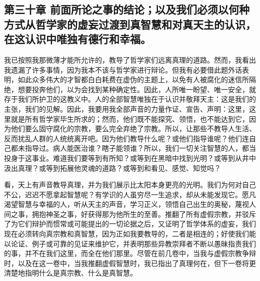 
\subsection{第三十章 前面所论之事的结论；以及我们必须以何种方式从哲学家的虚妄过渡到真智慧和对真天主的认识，在这认识中唯独有德行和幸福。}

我已按照我那微薄才能所允许的，教导了哲学家们远离真理的道路。然而，我看出我遗漏了许多事情，因为我本不该与哲学家进行辩论。但我有必要借此题外话表明，如此众多伟大的才智都白白耗费在虚伪的主题上，以免有人被腐化的迷信所隔绝，想要投奔他们，以为会找到某种确定性。因此，人所唯一盼望、唯一安全，就存于我们所护卫的这教义中。人的全部智慧唯独在于认识并敬拜天主：这是我们的主张，我们的见解。因此，我要用我全部声音的力量作证、宣告、声明：这里，这里就是所有哲学家毕生所求的；然而，他们既不能探究、领悟，也不能达到它，因为他们要么固守腐化的宗教，要么完全弃绝了宗教。所以，让那些不教导人生活、反而扰乱人群的人统统离开吧。因为他们教导什么呢？或他们指导谁呢？他们连自己都未指导过。病人能医治谁？瞎子能领谁？所以，我们一切关注智慧的人，都当投身于这事业。难道我们要等到有所知？或等到在黑暗中找到光明？或等到从井中汲出真理？或等到拓展他灵魂的道路？或等到和看见、感觉、知觉吗？\par

看，天上有声音教导真理，并为我们展示比太阳本身更亮的光明。我们为何对自己不公，迟迟不愿拿起智慧呢？有学识的人虽穷尽一生追求，却从未能发现它。愿凡渴望智慧与幸福的人，听从天主的声音，学习正义，领悟自己出生的奥秘，蔑视人间之事，拥抱神圣之事，好获得那为他所生的至善。推翻了所有虚假宗教，并驳斥了为它们辩护而惯常或可能提出的一切论据之后，又证明了哲学体系的虚妄，我们现在必须转向真宗教和真智慧，因为正如我要教导的，二者是相连的；好使我们能以论证、例子或可靠的见证来维护它，并表明那些异教崇拜者不断以愚昧指责我们的事，并不在我们这里，而全在他们那里。尽管在前几卷中，当我与虚假宗教争辩时，以及在这一卷中，当我推翻虚假智慧时，我已指出了真理何在，但下一卷将更清楚地指明什么是真宗教、什么是真智慧。\par



